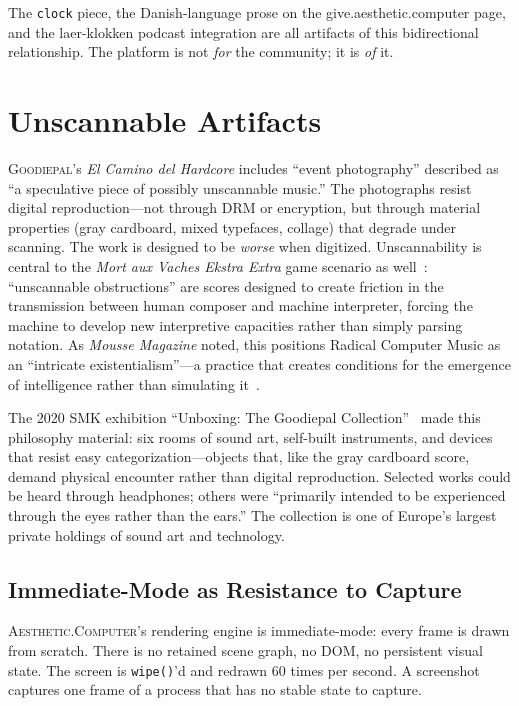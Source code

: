 \documentclass[10pt,letterpaper,twocolumn]{article}
\newcommand{\ac}{\textsc{Aesthetic.Computer}}
\newcommand{\gp}{\textsc{Goodiepal}}
\begin{document}
The \texttt{clock} piece, the Danish-language prose on the give.aesthetic.computer page, and the laer-klokken podcast integration are all artifacts of this bidirectional relationship. The platform is not \emph{for} the community; it is \emph{of} it.

\section{Unscannable Artifacts}

\gp{}'s \emph{El Camino del Hardcore} includes ``event photography'' described as ``a speculative piece of possibly unscannable music.'' The photographs resist digital reproduction---not through DRM or encryption, but through material properties (gray cardboard, mixed typefaces, collage) that degrade under scanning. The work is designed to be \emph{worse} when digitized. Unscannability is central to the \emph{Mort aux Vaches Ekstra Extra} game scenario as well~\citep{goodiepal2007mortauxvaches}: ``unscannable obstructions'' are scores designed to create friction in the transmission between human composer and machine interpreter, forcing the machine to develop new interpretive capacities rather than simply parsing notation. As \emph{Mousse Magazine} noted, this positions Radical Computer Music as an ``intricate existentialism''---a practice that creates conditions for the emergence of intelligence rather than simulating it~\citep{mousse2018goodiepal}.

The 2020 SMK exhibition ``Unboxing: The Goodiepal Collection''~\citep{smk2020unboxing} made this philosophy material: six rooms of sound art, self-built instruments, and devices that resist easy categorization---objects that, like the gray cardboard score, demand physical encounter rather than digital reproduction. Selected works could be heard through headphones; others were ``primarily intended to be experienced through the eyes rather than the ears.'' The collection is one of Europe's largest private holdings of sound art and technology.

\subsection{Immediate-Mode as Resistance to Capture}

\ac{}'s rendering engine is immediate-mode: every frame is drawn from scratch. There is no retained scene graph, no DOM, no persistent visual state. The screen is \texttt{wipe()}'d and redrawn 60 times per second. A screenshot captures one frame of a process that has no stable state to capture.
\end{document}
